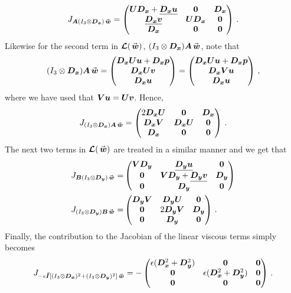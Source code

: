\[
  J_{\An (I_3 \otimes \Dx) \wn}
  =
  \begin{pmatrix}
     \Un \Dx + \diagn{\Dx\un} & \zeron & \Dx
     \\
     \diagn{\Dx \vn} & \Un \Dx & \zeron
     \\
     \Dx & \zeron & \zeron
  \end{pmatrix}
  \, .
\]
Likewise for the second term in $\euln(\wn)$, $(I_3 \otimes \Dx) \An \wn$, note that
\[
  (I_3 \otimes \Dx) \An \wn = 
  \begin{pmatrix}
    \Dx \Un \un  + \Dx \pn
    \\
    \Dx \Un \vn
    \\
    \Dx \un
  \end{pmatrix}
  =
  \begin{pmatrix}
    \Dx \Un \un  + \Dx \pn
    \\
    \Dx \Vn \un
    \\
    \Dx \un
  \end{pmatrix}
  \, ,
\]
where we have used that $\bm{V} \bm{u}  = \bm{U} \bm{v}$. Hence, 
\[
  J_{(I_3 \otimes \Dx) \An \wn} =
  \begin{pmatrix}
     2 \Dx \Un & \zeron & \Dx
     \\
     \Dx \Vn & \Dx \Un & \zeron
     \\
     \Dx & \zeron & \zeron
  \end{pmatrix}
  \, .
\]
The next two terms in $\euln(\wn)$ are treated in a similar manner and we get that
\begin{align*}
  J_{\Bn (I_3 \otimes \Dy) \wn} = &
  \begin{pmatrix}
     \Vn \Dy &  \diagn{\Dy\un} & \zeron
     \\
     \zeron & \Vn \Dy + \diagn{\Dy \vn} & \Dy
     \\
      \zeron & \Dy & \zeron
  \end{pmatrix}
  \\
  J_{(I_3 \otimes \Dy)\Bn\wn} = &
  \begin{pmatrix}
     \Dy\Vn &  \Dy\Un & \zeron
     \\
     \zeron & 2\Dy\Vn  & \Dy
     \\
      \zeron & \Dy & \zeron
  \end{pmatrix}
  \, .
\end{align*}
Finally, the contribution to the Jacobian of the linear viscous terms simply becomes
\[
  J_{-\epsilon\Itn [(I_3\otimes \Dx)^2 +(I_3\otimes \Dy)^2]\wn} =
  -
  \begin{pmatrix}
     \epsilon (\Dx^2 + \Dy^2) & \zeron & \zeron
     \\
     \zeron & \epsilon (\Dx^2 + \Dy^2) & \zeron
     \\
     \zeron & \zeron & \zeron
  \end{pmatrix}
  \, .
\]

